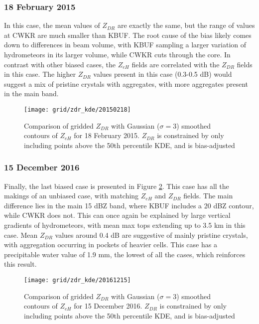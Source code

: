 \subsubsection{18 February 2015}
In this case, the mean values of $Z_{DR}$ are exactly the same, but the range of values at CWKR are much smaller than KBUF. The root cause of the bias likely comes down to differences in beam volume, with KBUF sampling a larger variation of hydrometeors in its larger volume, while CWKR cuts through the core. In contrast with other biased cases, the $Z_{eH}$ fields are correlated with the $Z_{DR}$ fields in this case. The higher $Z_{DR}$ values present in this case (0.3-0.5 dB) would suggest a mix of pristine crystals with aggregates, with more aggregates present in the main band. 
\begin{figure}[H]
\texttt{[image: grid/zdr\_kde/20150218]}
\caption{Comparison of gridded $Z_{DR}$ with Gaussian ($\sigma=3$) smoothed contours of $Z_{eH}$ for 18 February 2015. $Z_{DR}$ is constrained by only including points above the 50th percentile KDE, and is bias-adjusted} 
\label{fig:grid_zdr_kde_20150218}
\end{figure}

\subsubsection{15 December 2016}
Finally, the last biased case is presented in Figure \ref{fig:grid_zdr_kde_20161215}. This case has all the makings of an unbiased case, with matching $Z_{eH}$ and $Z_{DR}$ fields. The main difference lies in the main 15 dBZ band, where KBUF includes a 20 dBZ contour, while CWKR does not. This can once again be explained by large vertical gradients of hydrometeors, with mean max tops extending up to 3.5 km in this case. Mean $Z_{DR}$ values around 0.4 dB are suggestive of mainly pristine crystals, with aggregation occurring in pockets of heavier cells. This case has a precipitable water value of 1.9 mm, the lowest of all the cases, which reinforces this result.
\begin{figure}[H]
\texttt{[image: grid/zdr\_kde/20161215]}
\caption{Comparison of gridded $Z_{DR}$ with Gaussian ($\sigma=3$) smoothed contours of $Z_{eH}$ for 15 December 2016. $Z_{DR}$ is constrained by only including points above the 50th percentile KDE, and is bias-adjusted} 
\label{fig:grid_zdr_kde_20161215}
\end{figure}